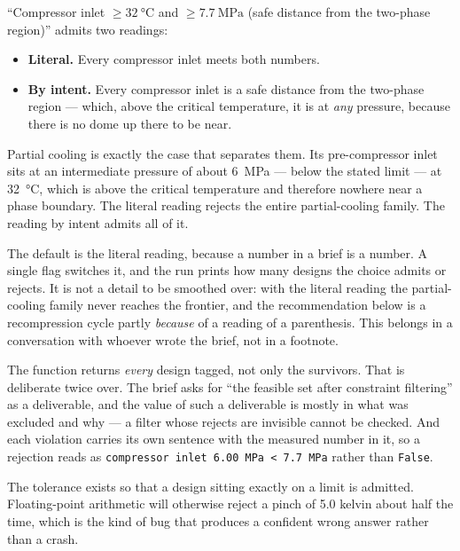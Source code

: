 \documentclass[11pt,a4paper]{report}
\newcommand{\code}[1]{\texttt{\small #1}}
\begin{document}
``Compressor inlet $\ge \SI{32}{\celsius}$ and $\ge \SI{7.7}{\mega\pascal}$
(safe distance from the two-phase region)'' admits two readings:

\begin{itemize}\itemsep2pt
\item \textbf{Literal.} Every compressor inlet meets both numbers.
\item \textbf{By intent.} Every compressor inlet is a safe distance from the
      two-phase region --- which, above the critical temperature, it is at
      \emph{any} pressure, because there is no dome up there to be near.
\end{itemize}

Partial cooling is exactly the case that separates them. Its pre-compressor
inlet sits at an intermediate pressure of about \SI{6}{\mega\pascal} ---
below the stated limit --- at \SI{32}{\celsius}, which is above the critical
temperature and therefore nowhere near a phase boundary. The literal reading
rejects the entire partial-cooling family. The reading by intent admits all
of it.

\begin{caveat}[title={Caveat: this one is unresolved}]
The default is the literal reading, because a number in a brief is a number.
A single flag switches it, and the run prints how many designs the choice
admits or rejects. It is not a detail to be smoothed over: with the literal
reading the partial-cooling family never reaches the frontier, and the
recommendation below is a recompression cycle partly \emph{because} of a
reading of a parenthesis. This belongs in a conversation with whoever wrote
the brief, not in a footnote.
\end{caveat}

\begin{choicebox}[title={Implementation: the filter returns its rejects}]

The function returns \emph{every} design tagged, not only the survivors.
That is deliberate twice over. The brief asks for ``the feasible set after
constraint filtering'' as a deliverable, and the value of such a deliverable
is mostly in what was excluded and why --- a filter whose rejects are
invisible cannot be checked. And each violation carries its own sentence
with the measured number in it, so a rejection reads as
\code{compressor inlet 6.00 MPa < 7.7 MPa} rather than \code{False}.

The tolerance exists so that a design sitting exactly on a limit is
admitted. Floating-point arithmetic will otherwise reject a pinch of
\num{5.0} kelvin about half the time, which is the kind of bug that produces
a confident wrong answer rather than a crash.
\end{choicebox}
\end{document}

